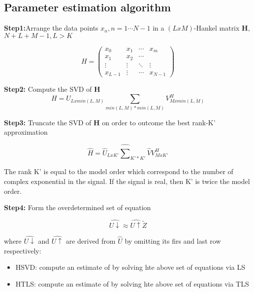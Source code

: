  
 
\newpage
\subsection{Parameter estimation algorithm}\label{Ap2}

\textbf{Step1:}Arrange the data points $x_{n},n=1\cdots N-1$ in a $(LxM)$-Hankel matrix \textbf{H}, $N+L+M-1,L>K$ 

\begin{equation}
H= 
 \begin{pmatrix}
  x_{0} & x_{1} & \cdots & x_{m} \\
  x_{1} & x_{2} & \cdots &   \\
  \vdots  & \vdots  & \ddots & \vdots  \\
  x_{L-1} & \vdots & \cdots & x_{N-1} 
 \end{pmatrix}
\end{equation}

 
 \textbf{Step2:} Compute the SVD of \textbf{H}
 \begin{equation}
 H=U_{Lxmin(L,M)}\sum_{min(L,M)*min(L,M)}V^{H}_{Mxmin(L,M)}
 \end{equation}
 
 \textbf{Step3:} Truncate the SVD of \textbf{H} on order to outcome the best rank-K' approximation 
 
 \begin{equation}
 \hat{H}=\hat{U}_{LxK'}\hat{\sum}_{K'*K'}\hat{V}V^{H}_{MxK'}
 \end{equation}
 
 The rank K' is equal to the model order which correspond to the number of complex exponential in the signal. If the signal is real, then K' is twice the model order.
 
 \textbf{Step4:} Form the overdetermined set of equation
 
 \begin{equation}
 \hat{U\downarrow}\approx\hat{U\uparrow}\tilde{Z}
 \end{equation}
 
 where $\hat{U\downarrow}$ and $\hat{U\uparrow}$ are derived from $\hat{U}$ by omitting its firs and last row respectively:
 
 \begin{itemize}
     \item HSVD: compute an estimate of  by solving hte above set of equations via LS
     \item HTLS: compute an estimate of  by solving hte above set of equations via TLS
 \end{itemize}
 
